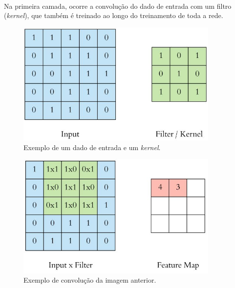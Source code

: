 \documentclass[grad,numbers]{coppe}
\begin{document}
		  \paragraph{}Na primeira camada, ocorre a convolução do dado de entrada com um filtro (\textit{kernel}), que também é treinado ao longo do treinamento de toda a rede.
		  \begin{figure}[h]
		  	\centering
		  	\includegraphics[width=10cm]{kernel.jpg}
		  	\caption{Exemplo de um dado de entrada e um \textit{kernel}\cite{kernel-example}.}
		  	\label{fig:kernel-fig}
		  \end{figure}
		  \newpage
	  	\begin{figure}[h]
	  		\centering
	  		\includegraphics[width=10cm]{kernel2.jpg}
	  		\caption{Exemplo de convolução da imagem anterior\cite{kernel-example}.}
	  		\label{fig:kernel2-fig}
	  	\end{figure}
\end{document}
